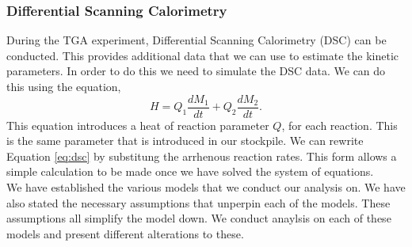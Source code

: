 \subsubsection{Differential Scanning Calorimetry}
During the TGA experiment, Differential Scanning Calorimetry (DSC) can be conducted. This provides additional data that we can use to estimate the kinetic parameters. In order to do this we need to simulate the DSC data. We can do this using the equation,
\begin{equation}
H=Q_1 \frac{dM_1}{dt}+Q_2 \frac{dM_2}{dt}. \label{eq:dsc}
\end{equation}
This equation introduces a heat of reaction parameter $Q$, for each reaction. This is the same parameter that is introduced in our stockpile. We can rewrite Equation \ref{eq:dsc} by substitung the arrhenous reaction rates. This form allows a simple calculation to be made once we have solved the system of equations.\\

We have established the various models that we conduct our analysis on. We have also stated the necessary assumptions that unperpin each of the models. These assumptions all simplify the model down. We conduct anaylsis on each of these models and present different alterations to these.